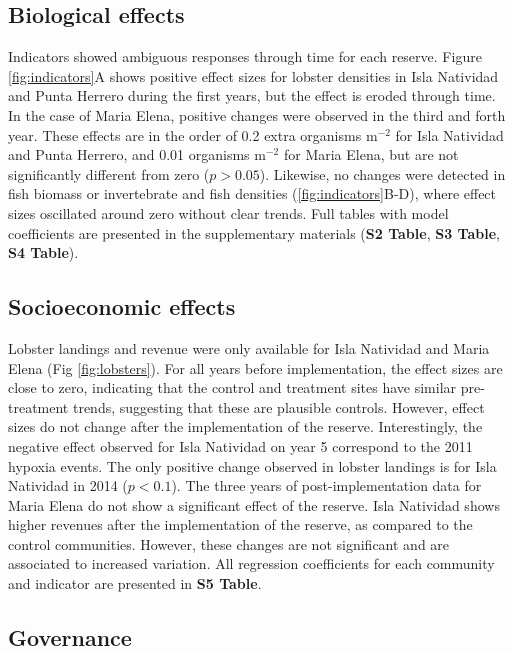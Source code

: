 \documentclass{frontiersSCNS}
\theoremstyle{definition}
\theoremstyle{definition}
\theoremstyle{definition}
\theoremstyle{remark}
\begin{document}
\subsection{Biological effects}\label{biological-effects}

Indicators showed ambiguous responses through time for each reserve.
Figure \ref{fig:indicators}A shows positive effect sizes for lobster
densities in Isla Natividad and Punta Herrero during the first years,
but the effect is eroded through time. In the case of Maria Elena,
positive changes were observed in the third and forth year. These
effects are in the order of 0.2 extra organisms \(\mathrm{m}^{-2}\) for
Isla Natividad and Punta Herrero, and 0.01 organisms \(\mathrm{m}^{-2}\)
for Maria Elena, but are not significantly different from zero
(\(p > 0.05\)). Likewise, no changes were detected in fish biomass or
invertebrate and fish densities (\ref{fig:indicators}B-D), where effect
sizes oscillated around zero without clear trends. Full tables with
model coefficients are presented in the supplementary materials
(\textbf{S2 Table}, \textbf{S3 Table}, \textbf{S4 Table}).

\subsection{Socioeconomic effects}\label{socioeconomic-effects}

Lobster landings and revenue were only available for Isla Natividad and
Maria Elena (Fig \ref{fig:lobsters}). For all years before
implementation, the effect sizes are close to zero, indicating that the
control and treatment sites have similar pre-treatment trends,
suggesting that these are plausible controls. However, effect sizes do
not change after the implementation of the reserve. Interestingly, the
negative effect observed for Isla Natividad on year 5 correspond to the
2011 hypoxia events. The only positive change observed in lobster
landings is for Isla Natividad in 2014 (\(p < 0.1\)). The three years of
post-implementation data for Maria Elena do not show a significant
effect of the reserve. Isla Natividad shows higher revenues after the
implementation of the reserve, as compared to the control communities.
However, these changes are not significant and are associated to
increased variation. All regression coefficients for each community and
indicator are presented in \textbf{S5 Table}.

\subsection{Governance}\label{governance}
\end{document}
